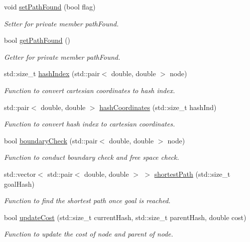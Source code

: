 \begin{DoxyCompactItemize}
void \hyperlink{classPathPlanner_add1eafe65f68d6f3aeb636ac4c43df20}{set\+Path\+Found} (bool flag)
\begin{DoxyCompactList}\small\item\em Setter for private member path\+Found. \end{DoxyCompactList}\item 
bool \hyperlink{classPathPlanner_a8de53119e913bcc4f0d69a68a5036a57}{get\+Path\+Found} ()
\begin{DoxyCompactList}\small\item\em Getter for private member path\+Found. \end{DoxyCompactList}\item 
std\+::size\+\_\+t \hyperlink{classPathPlanner_ab111391044dcb787797a087ec7e57e4a}{hash\+Index} (std\+::pair$<$ double, double $>$ node)
\begin{DoxyCompactList}\small\item\em Function to convert cartesian coordinates to hash index. \end{DoxyCompactList}\item 
std\+::pair$<$ double, double $>$ \hyperlink{classPathPlanner_a1ac7ef2a9a599c2db3b4670391b919e4}{hash\+Coordinates} (std\+::size\+\_\+t hash\+Ind)
\begin{DoxyCompactList}\small\item\em Function to convert hash index to cartesian coordinates. \end{DoxyCompactList}\item 
bool \hyperlink{classPathPlanner_aa9aed95ef982c4c5fbfae33a5ca6668b}{boundary\+Check} (std\+::pair$<$ double, double $>$ node)
\begin{DoxyCompactList}\small\item\em Function to conduct boundary check and free space check. \end{DoxyCompactList}\item 
std\+::vector$<$ std\+::pair$<$ double, double $>$ $>$ \hyperlink{classPathPlanner_ac0be211569bcef9d59cb6780fbcef3d8}{shortest\+Path} (std\+::size\+\_\+t goal\+Hash)
\begin{DoxyCompactList}\small\item\em Function to find the shortest path once goal is reached. \end{DoxyCompactList}\item 
bool \hyperlink{classPathPlanner_afd383f2dd9d6b7bc45b8a1977597e953}{update\+Cost} (std\+::size\+\_\+t current\+Hash, std\+::size\+\_\+t parent\+Hash, double cost)
\begin{DoxyCompactList}\small\item\em Function to update the cost of node and parent of node. \end{DoxyCompactList}\item 

\end{DoxyCompactItemize}
